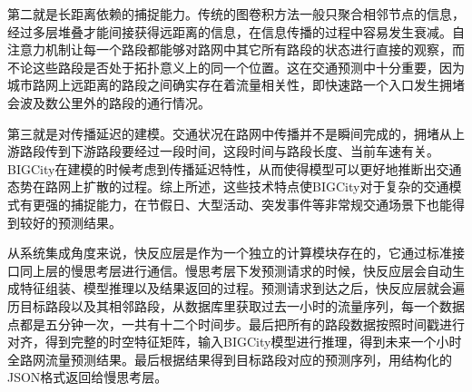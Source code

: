 第二就是长距离依赖的捕捉能力。传统的图卷积方法一般只聚合相邻节点的信息，经过多层堆叠才能间接获得远距离的信息，在信息传播的过程中容易发生衰减。自注意力机制让每一个路段都能够对路网中其它所有路段的状态进行直接的观察，而不论这些路段是否处于拓扑意义上的同一个位置。这在交通预测中十分重要，因为城市路网上远距离的路段之间确实存在着流量相关性，即快速路一个入口发生拥堵会波及数公里外的路段的通行情况。

第三就是对传播延迟的建模。交通状况在路网中传播并不是瞬间完成的，拥堵从上游路段传到下游路段要经过一段时间，这段时间与路段长度、当前车速有关。BIGCity在建模的时候考虑到传播延迟特性，从而使得模型可以更好地推断出交通态势在路网上扩散的过程。综上所述，这些技术特点使BIGCity对于复杂的交通模式有更强的捕捉能力，在节假日、大型活动、突发事件等非常规交通场景下也能得到较好的预测结果。

从系统集成角度来说，快反应层是作为一个独立的计算模块存在的，它通过标准接口同上层的慢思考层进行通信。慢思考层下发预测请求的时候，快反应层会自动生成特征组装、模型推理以及结果返回的过程。预测请求到达之后，快反应层就会遍历目标路段以及其相邻路段，从数据库里获取过去一小时的流量序列，每一个数据点都是五分钟一次，一共有十二个时间步。最后把所有的路段数据按照时间戳进行对齐，得到完整的时空特征矩阵，输入BIGCity模型进行推理，得到未来一个小时全路网流量预测结果。最后根据结果得到目标路段对应的预测序列，用结构化的JSON格式返回给慢思考层。